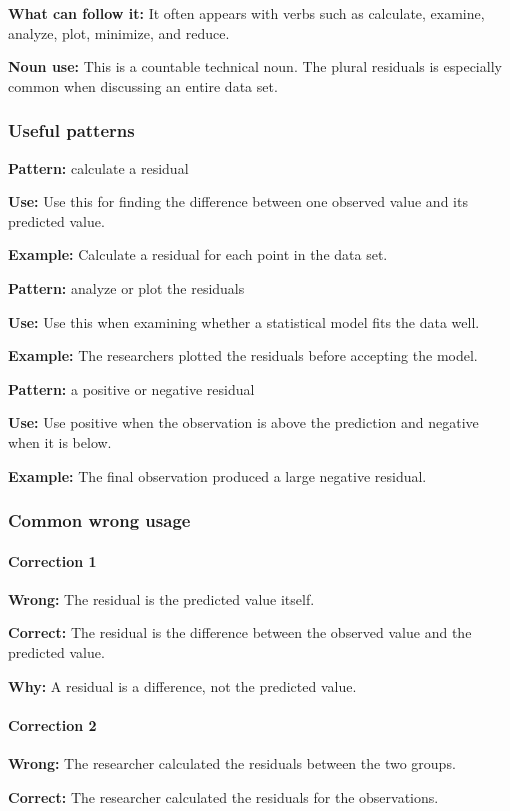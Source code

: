 \documentclass[11pt]{article}
\begin{document}
\textbf{What can follow it:} It often appears with verbs such as calculate, examine, analyze, plot, minimize, and reduce.

\textbf{Noun use:} This is a countable technical noun. The plural residuals is especially common when discussing an entire data set.

\subsubsection{Useful patterns}
\textbf{Pattern:} calculate a residual

\textbf{Use:} Use this for finding the difference between one observed value and its predicted value.

\textbf{Example:} Calculate a residual for each point in the data set.

\textbf{Pattern:} analyze or plot the residuals

\textbf{Use:} Use this when examining whether a statistical model fits the data well.

\textbf{Example:} The researchers plotted the residuals before accepting the model.

\textbf{Pattern:} a positive or negative residual

\textbf{Use:} Use positive when the observation is above the prediction and negative when it is below.

\textbf{Example:} The final observation produced a large negative residual.

\subsubsection{Common wrong usage}
\paragraph{Correction 1}
\textbf{Wrong:} The residual is the predicted value itself.

\textbf{Correct:} The residual is the difference between the observed value and the predicted value.

\textbf{Why:} A residual is a difference, not the predicted value.

\paragraph{Correction 2}
\textbf{Wrong:} The researcher calculated the residuals between the two groups.

\textbf{Correct:} The researcher calculated the residuals for the observations.
\end{document}
